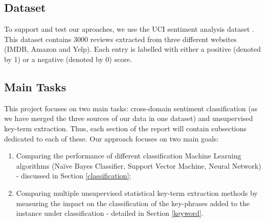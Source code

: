 \subsection{Dataset}
To support and test our aproaches, we use the UCI sentiment analysis dataset \cite{ucidata}. This dataset contains 3000 reviews extracted from three different websites (IMDB, Amazon and Yelp). Each entry is labelled with either a positive (denoted by 1) or a negative (denoted by 0) score.


\subsection{Main Tasks}
This project focuses on two main tasks: cross-domain sentiment classification (as we have merged the three sources of our data in one dataset) and unsupervised key-term extraction. Thus, each section of the report will contain subsections dedicated to each of these.
Our approach focuses on two main goals:
\begin{enumerate}
    \item Comparing the performance of different classification Machine Learning algorithms (Naïve Bayes Classifier, Support Vector Machine, Neural Network) - discussed in Section \ref{classification};
    \item Comparing multiple unsupervised statistical key-term extraction methods by measuring the impact on the classification of the key-phrases added to the instance under classification - detailed in Section \ref{keyword}.
\end{enumerate}
